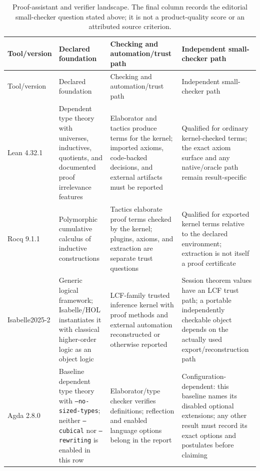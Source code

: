 \begin{landscape}
\thispagestyle{plain}
\begingroup\scriptsize
\setlength{\tabcolsep}{3pt}
\begin{longtable}{@{}p{1.00in}p{1.85in}p{2.10in}p{2.15in}@{}}
\caption{Proof-assistant and verifier landscape.  The final
column records the editorial small-checker question stated above; it is not a
product-quality score or an attributed source criterion.}
\label{tab:p12-assistant-landscape}\\
\toprule
Tool/version & Declared foundation & Checking and automation/trust path &
Independent small-checker path \\ \midrule
\endfirsthead
\toprule
Tool/version & Declared foundation & Checking and automation/trust path &
Independent small-checker path \\ \midrule
\endhead
Lean 4.32.1 & Dependent type theory with universes, inductives, quotients, and
documented proof irrelevance features & Elaborator and tactics produce terms
for the kernel; imported axioms, code-backed decisions, and external artifacts
must be reported & Qualified for ordinary kernel-checked terms; the exact axiom
surface and any native/oracle path remain result-specific
\cite{LeanManual2026,DeMouraUllrich2021} \\ \addlinespace
Rocq 9.1.1 & Polymorphic cumulative calculus of inductive constructions &
Tactics elaborate proof terms checked by the kernel; plugins, axioms, and
extraction are separate trust questions & Qualified for exported kernel terms
relative to the declared environment; extraction is not itself a proof
certificate \cite{RocqManual2026,PaulinMohring2015} \\ \addlinespace
Isabelle2025-2 & Generic logical framework; Isabelle/HOL instantiates it with
classical higher-order logic as an object logic & LCF-family trusted inference kernel with proof
methods and external automation reconstructed or otherwise reported &
Session theorem values have an LCF trust path; a portable independently
checkable object depends on the actually used export/reconstruction path
\cite{Isabelle2025} \\ \addlinespace
Agda 2.8.0 & Baseline dependent type theory with
\texttt{--no-sized-types}; neither \texttt{--cubical} nor
\texttt{--rewriting} is enabled in this row & Elaborator/type checker verifies
definitions; reflection and enabled language options belong in the report &
Configuration-dependent: this baseline names its disabled optional extensions;
any other result must record its exact options and postulates before claiming

\end{longtable}
\end{landscape}
